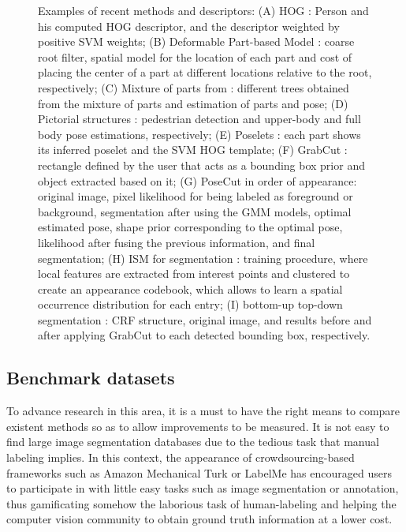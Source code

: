\documentclass[10pt,twocolumn,letterpaper]{article}
\begin{document}
\begin{figure}
 	\caption{Examples of recent methods and descriptors: (A) HOG \cite{dalal2005histograms}: Person and his computed HOG descriptor, and the descriptor weighted by positive SVM weights; (B) Deformable Part-based Model \cite{felzenszwalb2010object}: coarse root filter, spatial model for the location of each part and cost of placing the center of a part at different locations relative to the root, respectively; (C) Mixture of parts from \cite{yang2012articulated}: different trees obtained from the mixture of parts and estimation of parts and pose; (D) Pictorial structures \cite{andriluka2009pictorial}: pedestrian detection and upper-body and full body pose estimations, respectively; (E) Poselets \cite{wang2011learning}: each part shows its inferred poselet and the SVM HOG template; (F) GrabCut \cite{rother2004grabcut}: rectangle defined by the user that acts as a bounding box prior and object extracted based on it; (G) PoseCut \cite{bray2006posecut} in order of appearance: original image, pixel likelihood for being labeled as foreground or background, segmentation after using the GMM models, optimal estimated pose, shape prior corresponding to the optimal pose, likelihood after fusing the previous information, and final segmentation; (H) ISM for segmentation \cite{leibe2008robust}: training procedure, where local features are extracted from interest points and clustered to create an appearance codebook, which allows to learn a spatial occurrence distribution for each entry; (I) bottom-up top-down segmentation \cite{ladicky2010and}: CRF structure, original image, and results before and after applying GrabCut to each detected bounding box, respectively.}
 	\label{fig:stateoftheartmethods}
\end{figure}
 
\subsection{Benchmark datasets}
 
To advance research in this area, it is a must to have the right means to compare existent methods so as to allow improvements to be measured. It is not easy to find large image segmentation databases due to the tedious task that manual labeling implies. In this context, the appearance of crowdsourcing-based frameworks such as Amazon Mechanical Turk \cite{mechanicalturk} or LabelMe \cite{russell2008labelme} has encouraged users to participate in with little easy tasks such as image segmentation or annotation, thus gamificating somehow the laborious task of human-labeling and helping the computer vision community to obtain ground truth information at a lower cost.  
\end{document}
